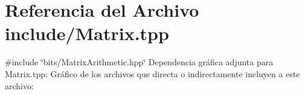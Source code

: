 \hypertarget{Matrix_8tpp}{}\section{Referencia del Archivo include/\+Matrix.tpp}
\label{Matrix_8tpp}
{\ttfamily \#include \char`\"{}bits/\+Matrix\+Arithmetic.\+hpp\char`\"{}}\newline
Dependencia gráfica adjunta para Matrix.\+tpp\+:
Gráfico de los archivos que directa o indirectamente incluyen a este archivo\+:
